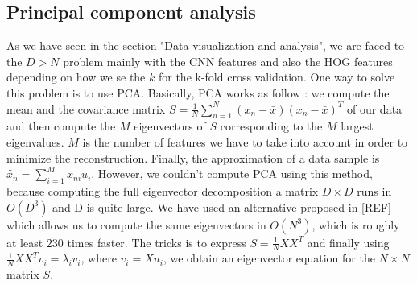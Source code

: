 \documentclass{article} %
\begin{document}
\begin{figure}[!ht]
\center
{}
\hfill
{}
\hfill
\caption{}
\end{figure}

\subsection{Principal component analysis}

As we have seen in the section "Data visualization and analysis", we are faced to the $D > N$ problem mainly with the CNN features and also the HOG features depending on how we se the $k$ for the k-fold cross validation. One way to solve this problem is to use PCA.  Basically, PCA works as follow : we compute the mean and the covariance matrix $S = \frac{1}{N}\sum_{n=1}^{N}(x_n-\bar{x})(x_n-\bar{x})^T$ of our data and then compute the $M$ eigenvectors of $S$ corresponding to the $M$ largest eigenvalues. $M$ is the number of features we have to take into account in order to minimize the reconstruction. Finally, the approximation of a data sample is $\tilde{x_n} = \sum_{i=1}^M x_{ni} u_i$. However, we couldn't compute PCA using this method, because computing the full eigenvector decomposition a matrix $D \times D$ runs in  $O(D^3)$ and D is quite large. 
We have used an alternative proposed in [REF] which allows us to compute the same eigenvectors in $O(N^3)$, which is roughly at least $230$ times faster. The tricks is to express $S = \frac{1}{N}XX^T$ and finally using $\frac{1}{N}XX^Tv_i = \lambda_i v_i$, where $v_i=Xu_i$, we obtain an eigenvector equation for the $N \times N$ matrix $S$.
\end{document}
